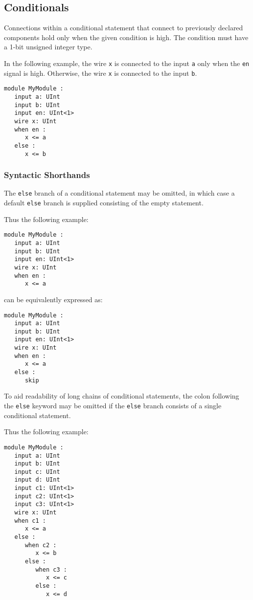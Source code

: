 \documentclass[12pt]{article}
\begin{document}
\subsection{Conditionals}\label{conditionals}
Connections within a conditional statement that connect to previously declared components hold only when the given condition is high. The condition must have a 1-bit unsigned integer type.

In the following example, the wire \verb|x| is connected to the input \verb|a| only when the \verb|en| signal is high. Otherwise, the wire \verb|x| is connected to the input \verb|b|. 

\begin{lstlisting}
module MyModule :
   input a: UInt
   input b: UInt
   input en: UInt<1>
   wire x: UInt
   when en :
      x <= a
   else :
      x <= b  
\end{lstlisting}

\subsubsection{Syntactic Shorthands}
The \verb|else| branch of a conditional statement may be omitted, in which case a default \verb|else| branch is supplied consisting of the empty statement.

Thus the following example:

\begin{lstlisting}
module MyModule :
   input a: UInt
   input b: UInt
   input en: UInt<1>
   wire x: UInt
   when en :
      x <= a
\end{lstlisting}

can be equivalently expressed as:

\begin{lstlisting}
module MyModule :
   input a: UInt
   input b: UInt
   input en: UInt<1>
   wire x: UInt
   when en :
      x <= a
   else : 
      skip   
\end{lstlisting}

To aid readability of long chains of conditional statements, the colon following the \verb|else| keyword may be omitted if the \verb|else| branch consists of a single conditional statement.

Thus the following example:

\begin{lstlisting}
module MyModule :
   input a: UInt
   input b: UInt
   input c: UInt
   input d: UInt
   input c1: UInt<1>
   input c2: UInt<1>
   input c3: UInt<1>
   wire x: UInt
   when c1 :
      x <= a
   else :
      when c2 :
         x <= b
      else :
         when c3 :
            x <= c  
         else :
            x <= d       
\end{lstlisting}
\end{document}
